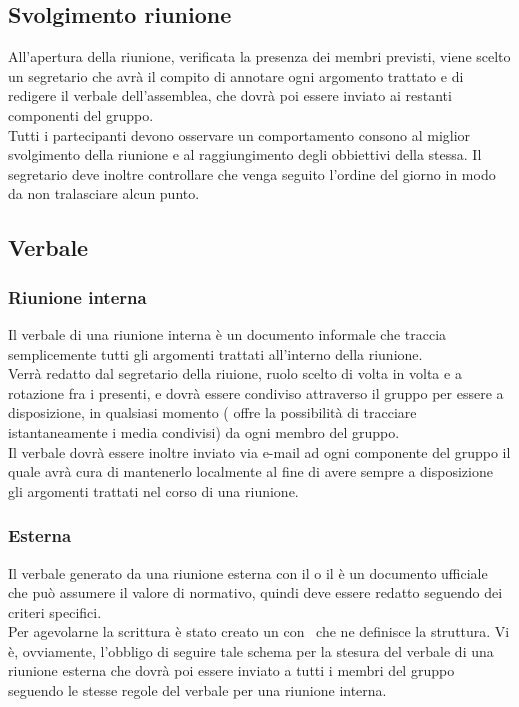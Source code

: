     \subsection{Svolgimento riunione}
      All’apertura della riunione, verificata la presenza dei membri previsti, viene scelto un segretario che avrà il compito di annotare ogni argomento trattato e di redigere il verbale
      dell’assemblea, che dovrà poi essere inviato ai restanti componenti del gruppo.\\
      Tutti i partecipanti devono osservare un comportamento consono al miglior svolgimento della riunione e al raggiungimento degli obbiettivi della stessa. Il segretario deve inoltre
      controllare che venga seguito l’ordine del giorno in modo da non tralasciare alcun punto.
    \subsection{Verbale}
      \subsubsection{Riunione interna}
        Il verbale di una riunione interna è un documento informale che traccia semplicemente tutti gli argomenti trattati all'interno della riunione.\\
        Verrà redatto dal segretario della riuione, ruolo scelto di volta in volta e a rotazione fra i presenti, e dovrà essere condiviso attraverso il gruppo \textbf{}
        per essere a disposizione, in qualsiasi momento (\textbf{} offre la possibilità di tracciare istantaneamente i media condivisi) da ogni membro del gruppo.\\
        Il verbale dovrà essere inoltre inviato via e-mail ad ogni componente del gruppo il quale avrà cura di mantenerlo localmente al fine di avere sempre a disposizione
        gli argomenti trattati nel corso di una riunione.
      \subsubsection{Esterna}
        Il verbale generato da una riunione esterna con il  o il  è un documento ufficiale che può assumere il valore di normativo, quindi deve essere redatto
        seguendo dei criteri specifici.\\
        Per agevolarne la scrittura è stato creato un  con \glossaryItem{\LaTeX}\ che ne definisce la struttura.
        Vi è, ovviamente, l'obbligo di seguire tale schema per la stesura del verbale di una riunione esterna che dovrà poi essere inviato a tutti i membri del gruppo seguendo
        le stesse regole del verbale per una riunione interna.
